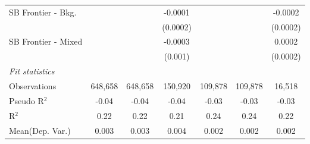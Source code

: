 \begin{tabular}{lcccccc}
   SB Frontier - Bkg.   &               &                & -0.0001         &               &                & -0.0002\\   
                        &               &                & (0.0002)        &               &                & (0.0002)\\   
   SB Frontier - Mixed  &               &                & -0.0003         &               &                & 0.0002\\   
                        &               &                & (0.001)         &               &                & (0.0002)\\   
   \midrule
   \emph{Fit statistics}\\
   Observations         & 648,658       & 648,658        & 150,920         & 109,878       & 109,878        & 16,518\\  
   Pseudo R$^2$         & -0.04         & -0.04          & -0.04           & -0.03         & -0.03          & -0.03\\  
   R$^2$                & 0.22          & 0.22           & 0.21            & 0.24          & 0.24           & 0.22\\  
Mean(Dep. Var.) & 0.003 & 0.003 & 0.004 & 0.002 & 0.002 & 0.002 \\
   

\end{tabular}
